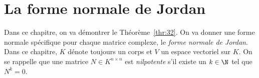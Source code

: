 
\chapter{La forme normale de Jordan}
\label{cha:la-forme-normale}




\noindent 
Dans ce chapitre, on va démontrer le Théorème~\ref{thr:32}.  On va donner une forme normale spécifique pour chaque matrice complexe, le \emph{forme normale de Jordan}.
Dans ce chapitre, $K$ dénote toujours un corps et $V$ un espace vectoriel sur $K$. 
On se rappelle que une  matrice $N ∈ K^{n ×n}$ est \emph{nilpotente} s'il existe un $k \in \N$ tel que $N^k = 0$.






